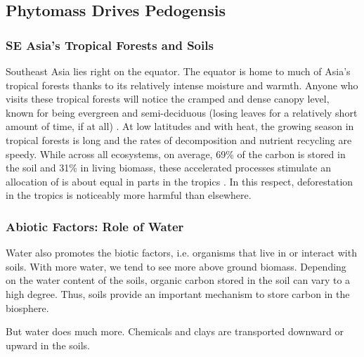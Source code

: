 \subsection{Phytomass Drives Pedogensis}

\subsubsection{SE Asia's Tropical Forests and Soils}

Southeast Asia lies right on the equator. The equator is home to much of Asia's tropical forests thanks to its relatively intense moisture and warmth. Anyone who visits these tropical forests will notice the cramped and dense canopy level, known for being evergreen and semi-deciduous (losing leaves for a relatively short amount of time, if at all) \citep{lieth2012tropical}. At low latitudes and with heat, the growing season in tropical forests is long and the rates of decomposition and nutrient recycling are speedy. While across all ecosystems, on average, 69\% of the carbon is stored in the soil and 31\% in living biomass, these accelerated processes stimulate an allocation of is about equal in parts in the tropics \citep{dixon1994carbon}. In this respect, deforestation in the tropics is noticeably more harmful than elsewhere.


 
\subsubsection{Abiotic Factors: Role of Water}

Water also promotes the biotic factors, i.e. organisms that live in or interact with soils. With more water, we tend to see more above ground biomass. Depending on the water content of the soils, organic carbon stored in the soil can vary to a high degree.  Thus, soils provide an important mechanism to store carbon in the biosphere.


But water does much more. Chemicals and clays are transported downward or upward in the soils.
 


